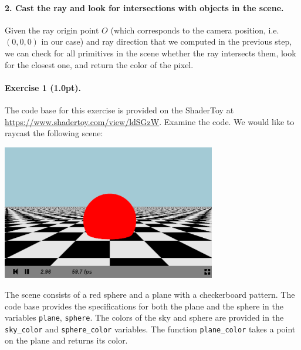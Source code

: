 \documentclass{article}
\newenvironment{exercise}[2]{\paragraph{Exercise #1 (#2pt).} }{
\medskip}
\begin{document}
\paragraph{2. Cast the ray and look for intersections with objects in the scene.} Given the ray origin point $O$ (which corresponds to the camera position, i.e. $(0, 0, 0)$ in our case) and ray direction that we computed in the previous step, we can check for all primitives in the scene whether the ray intersects them, look for the closest one, and return the color of the pixel.

\begin{exercise}{1}{1.0}
The code base for this exercise is provided on the ShaderToy at \url{https://www.shadertoy.com/view/ldSGzW}. Examine the code. We would like to raycast the following scene:
\begin{center}
\includegraphics[width=0.7\textwidth]{raycasting.png}
\end{center}
The scene consists of a red sphere and a plane with a checkerboard pattern. The code base provides the specifications for both the plane and the sphere in the variables \texttt{plane}, \texttt{sphere}. The colors of the sky and sphere are provided in the \verb#sky_color# and \verb#sphere_color# variables. The function \verb#plane_color# takes a point on the plane and returns its color.


\end{exercise}
\end{document}
